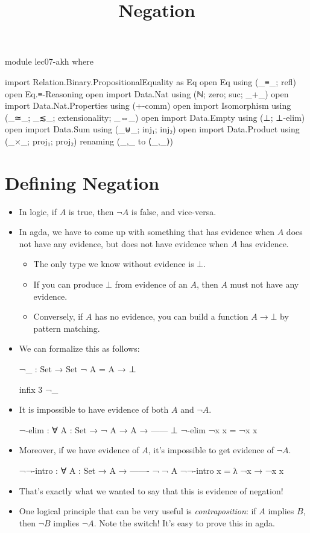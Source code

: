 \documentclass{lecturenotes}
\title{Negation}
\begin{document}
\maketitle

\begin{code}
module lec07-akh where

import Relation.Binary.PropositionalEquality as Eq
open Eq using (_≡_; refl)
open Eq.≡-Reasoning
open import Data.Nat using (ℕ; zero; suc; _+_)
open import Data.Nat.Properties using (+-comm)
open import Isomorphism using (_≃_; _≲_; extensionality; _⇔_)
open import Data.Empty using (⊥; ⊥-elim)
open import Data.Sum using (_⊎_; inj₁; inj₂)
open import Data.Product using (_×_; proj₁; proj₂) renaming (_,_ to ⟨_,_⟩)
\end{code}

\section{Defining Negation}
\label{sec:defining-negation}

\begin{itemize}
\item In logic, if $A$ is true, then $\lnot A$ is false, and vice-versa.
\item In agda, we have to come up with something that has evidence when $A$ does not have any evidence, but does not have evidence when $A$ has evidence.
  \begin{itemize}
  \item The only type we know without evidence is $\bot$.
  \item If you can produce $\bot$ from evidence of an $A$, then $A$ must not have any evidence.
  \item Conversely, if $A$ has no evidence, you can build a function $A \to \bot$ by pattern matching.    
  \end{itemize}
\item We can formalize this as follows:
\begin{code}
¬_ : Set → Set
¬ A = A → ⊥

infix 3 ¬_    
\end{code}
\item It is impossible to have evidence of both $A$ and $\lnot A$.
\begin{code}
¬-elim : ∀ {A : Set} →
  ¬ A →
    A →
  ------
    ⊥
¬-elim ¬x x = ¬x x  
\end{code}
\item Moreover, if we have evidence of $A$, it's impossible to get evidence of $\lnot A$.
\begin{code}
¬¬-intro : ∀ {A : Set} →
     A →
  -------
   ¬ ¬ A
¬¬-intro x = λ {¬x → ¬x x}    
\end{code}
\item That's exactly what we wanted to say that this is evidence of negation!
\item One logical principle that can be very useful is \emph{contraposition}: if $A$ implies $B$, then $\lnot B$ implies $\lnot A$.
  Note the switch!
  It's easy to prove this in agda.
\end{itemize}
\end{document}
